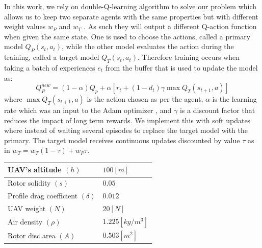 \documentclass[journal,twocolumn]{IEEEtran}
\begin{document}
{In this work, we rely on double-Q-learning algorithm to solve our problem which allows us to keep two separate agents with the same properties but with different weight values $w_P$ and $w_T$ . As such they will output a different Q-action function when given the same state. One is used to choose the actions, called a primary model $\textit{Q}_{P}(s_t, a_t)$, while the other model evaluates the action during the training, called a target model $\textit{Q}_{T}(s_t, a_t)$. Therefore training occurs when taking a batch of experiences $e_t$ from the buffer that is used to update the model as:
\begin{equation}\label{Double-dqn}
\textit{Q}_P^{new} = (1 - \alpha)\textit{Q}_p + \alpha \left[r_t + (1-d_t)\gamma \max{\textit{Q}_T(s_{t+1},a)} \right]
\end{equation}
where $\max{\textit{Q}_T(s_{t+1},a)}$ is the action chosen as per the agent, $\alpha$ is the learning rate which was an input to the Adam optimizer \cite{kingma2014adam}, and $\gamma$ is a discount factor that reduces the impact of long term rewards. We implement this with soft updates where instead of waiting several episodes to replace the target model with the primary. The target model receives continuous updates discounted by value $\tau$ as in $w_T = w_T(1 - \tau) + w_P\tau$.




\begin{table}[t]
\begin{center}
\begin{tabular}{ | m{5.75cm} | m{2cm} | }
 \hline
   UAV's altitude $(h)$ & $100 [m]$ \\
  \hline
   Rotor solidity $(s)$ & $0.05$ \\ 
   \hline

   Profile drag coefficient $(\delta)$  & $0.012$ \\ 
   \hline
   
   UAV weight $(N)$ & $20[N]$\\ 
   \hline
 
   Air density $(\rho)$ & $1.225 [kg/m^3]$  \\ 
  \hline
   
   Rotor disc area $(A)$  & $0.503 [m^2]$ \\ 
   \hline
   

\end{tabular}
\end{center}
\end{table}}
\end{document}
